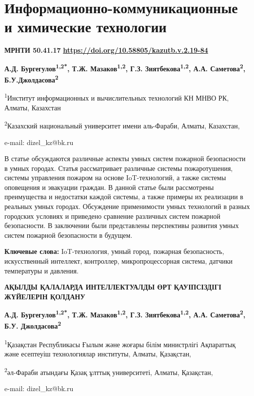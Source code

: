 \let\cleardoublepage\clearpage
\chapter{Информационно-коммуникационные и химические технологии}

{\bfseries МРНТИ 50.41.17} \hfill
\hfill {\bfseries \href{https://doi.org/10.58805/kazutb.v.2.19-84}{https://doi.org/10.58805/kazutb.v.2.19-84}}

\begin{center}
{\bfseries А.Д. Бургегулов\textsuperscript{1,2*}, Т.Ж.
Мазаков\textsuperscript{1,2}, Г.З. Зиятбекова\textsuperscript{1,2}, А.А.
Саметова\textsuperscript{2}, Б.У.Джолдасова\textsuperscript{2}}

\textsuperscript{1}Институт информационных и вычислительных технологий
КН МНВО РК, Алматы, Казахстан

\textsuperscript{2}Казахский национальный университет имени аль-Фараби,
Алматы, Казахстан,

e-mail: dizel\_kz@bk.ru
\end{center}

В статье обсуждаются различные аспекты умных систем пожарной
безопасности в умных городах. Статья рассматривает различные системы
пожаротушения, системы управления пожаром на основе IoT-технологий, а
также системы оповещения и эвакуации граждан. В данной статье были
рассмотрены преимущества и недостатки каждой системы, а также примеры их
реализации в реальных умных городах. Обсуждение применимости умных
технологий в разных городских условиях и приведено сравнение различных
систем пожарной безопасности. В заключении были представлены перспективы
развития умных систем пожарной безопасности в будущем.

{\bfseries Ключевые слова:} IoT-технология, умный город, пожарная
безопасность, искусственный интеллект, контроллер, микропроцессорная
система, датчики температуры и давления.

\begin{center}
{\large\bfseries АҚЫЛДЫ ҚАЛАЛАРДА ИНТЕЛЛЕКТУАЛДЫ ӨРТ ҚАУІПСІЗДІГІ ЖҮЙЕЛЕРІН ҚОЛДАНУ}

\vspace{1em}
{\bfseries А.Д. Бургегулов\textsuperscript{1,2*}, Т.Ж.
Мазаков\textsuperscript{1,2}, Г.З. Зиятбекова\textsuperscript{1,2}, А.А.
Саметова\textsuperscript{2}, Б.У. Джолдасова\textsuperscript{2}}

\textsuperscript{1}Қазақстан Республикасы Ғылым және жоғары білім
министрлігі Ақпараттық және есептеуіш технологиялар институты, Алматы,
Қазақстан,

\textsuperscript{2}әл-Фараби атындағы Қазақ ұлттық университеті, Алматы,
Қазақстан,

e-mail: dizel\_kz@bk.ru
\end{center}

